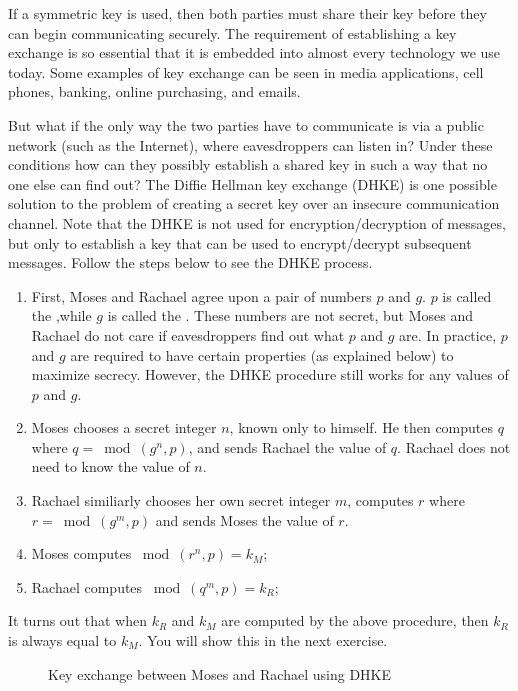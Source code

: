   If a symmetric key is used, then both parties must share their key before they can begin communicating securely. The requirement of establishing a key exchange is so essential that it is embedded into almost every technology we use today.  Some examples of key exchange can be seen in media applications, cell phones, banking, online purchasing, and emails.  

 But what if the only way the two parties have to communicate is via a public network (such as the Internet), where eavesdroppers can listen in?  Under these conditions how can they possibly establish a shared key in such a way that no one else can find out?  The Diffie Hellman key exchange (DHKE) is one possible solution to the problem of creating a secret key over an insecure communication channel.  Note that the DHKE is not used for encryption/decryption of messages, but only to establish a key that can be used to encrypt/decrypt subsequent messages.  Follow the steps below to see the DHKE process.  

 \begin{enumerate}[Step 1.]
 \item First, Moses and Rachael agree upon a pair of numbers $p$ and $g$. $p$ is called the ,while $g$ is called the . These numbers are not secret, but Moses and Rachael do not care if eavesdroppers find out what $p$ and $g$ are. In practice, $p$ and $g$ are required to have certain properties (as explained below) to maximize secrecy.  However, the DHKE procedure still works for any values of $p$ and $g$.
\item Moses chooses a secret integer $n$, known only to himself.  He then computes $q$ where $q =\bmod(g^n,p)$, and sends Rachael the value of $q$. Rachael does not need to know the value of $n$.
\item Rachael similiarly chooses her own secret integer $m$, computes $r$ where $r =\bmod(g^m,p)$ and sends Moses the value of $r$.
\item Moses computes $ \bmod (r^n , p ) = k_M$;
\item Rachael computes $ \bmod (q^m , p ) = k_R$;
\end{enumerate} 
It turns out that when $k_R$ and $k_M$ are computed by the above procedure, then $k_R$ is always equal to $k_M$.  You will show this in the next exercise.  
\begin{figure}[htb]
	  \caption{\label{fig:DH:DHKE_1} Key exchange between Moses and Rachael using DHKE}
\end{figure}

